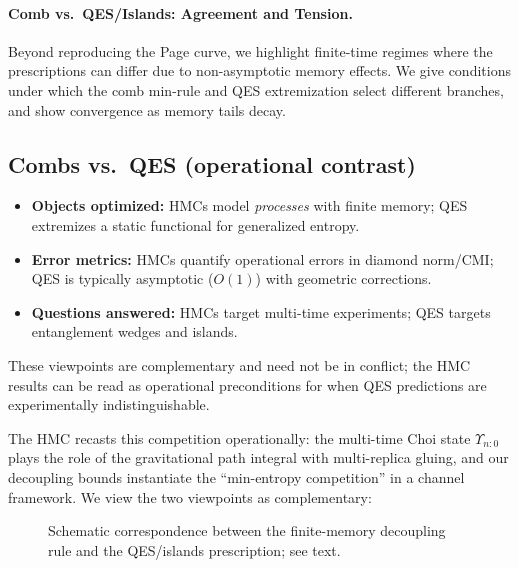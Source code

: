 \documentclass[a4paper,11pt]{article}
\newcommand{\HMC}{\textup{\textsc{HMC}}\xspace}
\theoremstyle{plain}
\theoremstyle{definition}
\theoremstyle{remark}
\begin{document}
\paragraph{Comb vs.\ QES/Islands: Agreement and Tension.}
Beyond reproducing the Page curve, we highlight finite-time regimes where the prescriptions can differ due to non-asymptotic memory effects. We give conditions under which the comb min-rule and QES extremization select different branches, and show convergence as memory tails decay. 

\subsection{Combs vs.\ QES (operational contrast)}
\label{app:comb-vs-qes}
\begin{itemize}[leftmargin=*,itemsep=0.25em]
  \item \textbf{Objects optimized:} \HMC{}s model \emph{processes} with finite memory; QES extremizes a static functional for generalized entropy.
  \item \textbf{Error metrics:} \HMC{}s quantify operational errors in diamond norm/CMI; QES is typically asymptotic ($O(1)$) with geometric corrections.
  \item \textbf{Questions answered:} \HMC{}s target multi-time experiments; QES targets entanglement wedges and islands.
\end{itemize}
These viewpoints are complementary and need not be in conflict; the \HMC{} results can be read as operational preconditions for when QES predictions are experimentally indistinguishable.


The \HMC{} recasts this competition operationally:
the multi-time Choi state $\Upsilon_{n{:}0}$ plays the role of the gravitational path integral with multi-replica gluing,
and our decoupling bounds instantiate the ``min-entropy competition'' in a channel framework.
We view the two viewpoints as complementary:

\begin{figure}[t]
\centering
{}
\caption{Schematic correspondence between the finite-memory decoupling rule and the QES/islands prescription; see text.}
\label{fig:decoupling-qes}
\end{figure}
\end{document}

